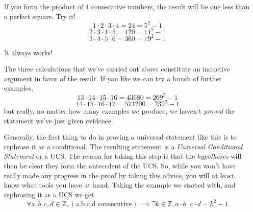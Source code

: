 \documentclass[10pt,]{book}
\theoremstyle{plain}
\theoremstyle{definition}
\theoremstyle{definition}
\numberwithin{equation}{section}
\newcommand{\Integers}{{\mathbb Z}}
\begin{document}
    If you form the product of 4 consecutive numbers, the result will be one
    less than a perfect square. Try it!
    \begin{equation*}
      1 \cdot 2 \cdot 3 \cdot 4 = 24 = 5^2 - 1
    \end{equation*}
    \begin{equation*}
      2 \cdot 3 \cdot 4 \cdot 5 = 120 = 11^2 - 1
    \end{equation*}
    \begin{equation*}
      3 \cdot 4 \cdot 5 \cdot 6 = 360 = 19^2 - 1
    \end{equation*}
\par

    It always works!
\par

    The three calculations that we've carried out above constitute an
    inductive argument in favor of the result. If you like we can try
    a bunch of further examples,
    \begin{equation*}
      13 \cdot 14 \cdot 15 \cdot 16 = 43680 = 209^2 - 1
    \end{equation*}
    \begin{equation*}
      14 \cdot 15 \cdot 16 \cdot 17 = 571200 = 239^2 - 1
    \end{equation*}
    but really, no matter how many examples we produce, we haven't
    \emph{proved} the statement \textemdash{} we've just given evidence.
\par

    Generally, the first thing to do in proving a universal statement like
    this is to rephrase it as a conditional. The resulting statement is a
    \emph{Universal Conditional Statement}
    or a UCS. The reason for taking
    this step is that the \emph{hypotheses} will then be clear \textemdash{} they form
    the antecedent of the UCS. So, while you won't have really made any
    progress in the proof by taking this advice, you will at least know what tools
    you have at hand. Taking the example we started with, and rephrasing
    it as a UCS we get
    \begin{equation*}
      \forall a,b,c,d \in \Integers, (\mbox{a,b,c,d  consecutive} ) 
      \implies \exists k \in \Integers, a{\cdot}b{\cdot}c{\cdot}d = k^2 -1
    \end{equation*}
\par
\end{document}
